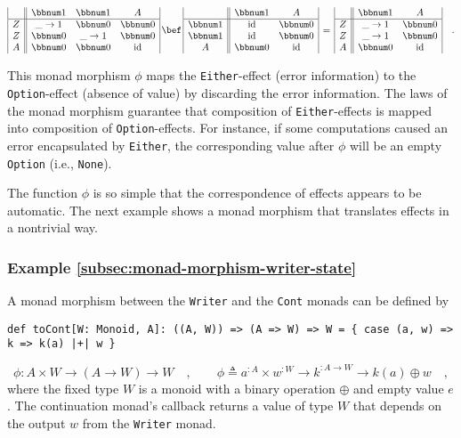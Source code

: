 \begin{align*}
\begin{array}{|c||ccc|}
 & \bbnum 1 & \bbnum 1 & A\\
\hline Z & \_\rightarrow1 & \bbnum 0 & \bbnum 0\\
Z & \bbnum 0 & \_\rightarrow1 & \bbnum 0\\
A & \bbnum 0 & \bbnum 0 & \text{id}
\end{array}\,\bef\,\begin{array}{|c||cc|}
 & \bbnum 1 & A\\
\hline \bbnum 1 & \text{id} & \bbnum 0\\
\bbnum 1 & \text{id} & \bbnum 0\\
A & \bbnum 0 & \text{id}
\end{array}\,=\,\begin{array}{|c||cc|}
 & \bbnum 1 & A\\
\hline Z & \_\rightarrow1 & \bbnum 0\\
Z & \_\rightarrow1 & \bbnum 0\\
A & \bbnum 0 & \text{id}
\end{array}\quad.
\end{align*}

This monad morphism $\phi$ maps the \lstinline!Either!-effect (error
information) to the \lstinline!Option!-effect (absence of value)
by discarding the error information. The laws of the monad morphism
guarantee that composition of \lstinline!Either!-effects is mapped
into composition of \lstinline!Option!-effects. For instance, if
some computations caused an error encapsulated by \lstinline!Either!,
the corresponding value after $\phi$ will be an empty \lstinline!Option!
(i.e., \lstinline!None!). 

The function $\phi$ is so simple that the correspondence of effects
appears to be automatic. The next example shows a monad morphism that
translates effects in a nontrivial way.

\subsubsection{Example \label{subsec:monad-morphism-writer-state}\ref{subsec:monad-morphism-writer-state}}

A monad morphism between the \lstinline!Writer! and the \lstinline!Cont!
monads can be defined by
\begin{lstlisting}
def toCont[W: Monoid, A]: ((A, W)) => (A => W) => W = { case (a, w) => k => k(a) |+| w }
\end{lstlisting}
\[
\phi:A\times W\rightarrow\left(A\rightarrow W\right)\rightarrow W\quad,\quad\quad\phi\triangleq a^{:A}\times w^{:W}\rightarrow k^{:A\rightarrow W}\rightarrow k\left(a\right)\oplus w\quad,
\]
where the fixed type $W$ is a monoid with a binary operation $\oplus$
and empty value $e$. The continuation monad\textsf{'}s callback returns a
value of type $W$ that depends on the output $w$ from the \lstinline!Writer!
monad.

